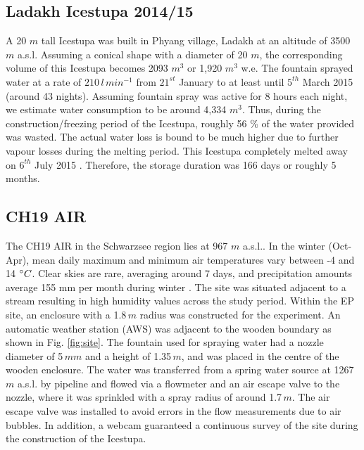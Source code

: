 \documentclass[utf8]{frontiersSCNS} %
\begin{document}
\subsection{Ladakh Icestupa 2014/15} \label{section:ladakhloss} 
A 20 $m$ tall Icestupa \citep{iceheight} was built in Phyang village, Ladakh at an altitude of 3500 $m$ a.s.l. Assuming
a conical shape with a diameter of 20 $m$, the corresponding volume of this Icestupa becomes 2093 $m^3$ or 1,920 $m^3$
w.e. The fountain sprayed water at a rate of $210\, l\,min^{-1}$ \citep{waterinput} from $21^{st}$ January
\citep{waterstart} to at least until $5^{th}$ March 2015 \citep{waterend} (around 43 nights). Assuming fountain spray
was active for 8 hours each night, we estimate water consumption to be around 4,334 $m^3$. Thus, during the
construction/freezing period of the Icestupa, roughly 56 \% of the water provided was wasted. The actual water loss is
bound to be much higher due to further vapour losses during the melting period. This Icestupa completely melted away on
$6^{th}$ July 2015 \citep{iceends}. Therefore, the storage duration was 166 days or roughly 5 months. 

\subsection{CH19 AIR}\label{section:CH19}
The CH19 AIR in the Schwarzsee region lies at 967 $m$ a.s.l.. In the winter (Oct-Apr), mean daily maximum
and minimum air temperatures vary between -4 and 14 $\degree C$. Clear skies are rare, averaging around 7 days, and
precipitation amounts average 155 mm per month during winter \citep{eispalast}. The site was situated adjacent to a
stream resulting in high humidity values across the study period. Within the EP site, an enclosure with a 1.8\,$m$
radius was constructed for the experiment. An automatic weather station (AWS) was adjacent to the wooden
boundary as shown in Fig. \ref{fig:site}. The fountain used for spraying water had a nozzle diameter of 5\,$mm$ and a
height of 1.35\,$m$, and was placed in the centre of the wooden enclosure. The water was transferred from a spring
water source at 1267 $m$ a.s.l. by pipeline and flowed via a flowmeter and an air escape valve to the nozzle, where it
was sprinkled with a spray radius of around 1.7\,$m$. The air escape valve was installed to avoid errors in the flow
measurements due to air bubbles. In addition, a webcam guaranteed a continuous survey of the site during the
construction of the Icestupa. 
\end{document}

